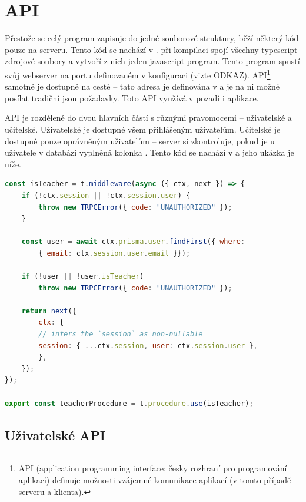 \section{API}
\label{api}

Přestože se celý program zapisuje do jedné souborové struktury, běží některý kód pouze na serveru. Tento kód se nachází v .  při kompilaci spojí všechny typescript zdrojové soubory a vytvoří z nich jeden javascript program. Tento program spustí svůj webserver na portu definovaném v konfiguraci (vizte ODKAZ). API\footnote{API (application programming interface; česky rozhraní pro programování aplikací) definuje možnosti vzájemné komunikace aplikací (v tomto případě serveru a klienta).} samotné je dostupné na cestě  -- tato adresa je definována v  a je na ni možné posílat tradiční json požadavky. Toto API využívá v pozadí i aplikace.

API je rozdělené do dvou hlavních částí s různými pravomocemi -- uživatelské a učitelské. Uživatelské je dostupné všem přihlášeným uživatelům. Učitelské je dostupné pouze oprávněným uživatelům -- server si zkontroluje, pokud je u uživatele v databázi vyplněná kolonka . Tento kód se nachází v  a jeho ukázka je níže.

\begin{lstlisting}[language=JavaScript,caption={Kontrola přístupu do učitelského rozhraní}]
const isTeacher = t.middleware(async ({ ctx, next }) => {
    if (!ctx.session || !ctx.session.user) {
        throw new TRPCError({ code: "UNAUTHORIZED" });
    }
    
    const user = await ctx.prisma.user.findFirst({ where: 
        { email: ctx.session.user.email }});

    if (!user || !user.isTeacher)
        throw new TRPCError({ code: "UNAUTHORIZED" });
    
    return next({
        ctx: {
        // infers the `session` as non-nullable
        session: { ...ctx.session, user: ctx.session.user },
        },
    });
});

export const teacherProcedure = t.procedure.use(isTeacher);
\end{lstlisting}

\subsection{Uživatelské API}
\label{userapi}

